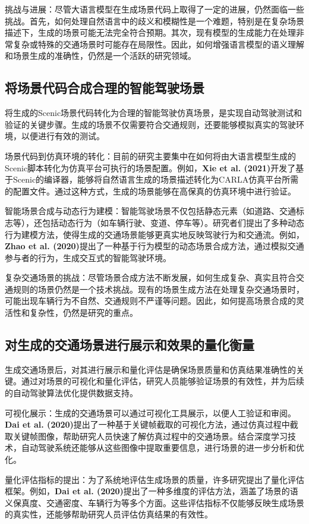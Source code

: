 	挑战与进展：尽管大语言模型在生成场景代码上取得了一定的进展，仍然面临一些挑战。首先，如何处理自然语言中的歧义和模糊性是一个难题，特别是在复杂场景描述下，生成的场景可能无法完全符合预期。其次，现有模型的生成能力在处理非常复杂或特殊的交通场景时可能存在局限性。因此，如何增强语言模型的语义理解和场景生成的准确性，仍然是一个活跃的研究领域。
	
	\subsection{将场景代码合成合理的智能驾驶场景}
	将生成的Scenic场景代码转化为合理的智能驾驶仿真场景，是实现自动驾驶测试和验证的关键步骤。生成的场景不仅需要符合交通规则，还要能够模拟真实的驾驶环境，以便进行有效的测试。
	
	场景代码到仿真环境的转化：目前的研究主要集中在如何将由大语言模型生成的Scenic脚本转化为仿真平台可执行的场景配置。例如，\textbf{Xie et al. (2021)}开发了基于Scenic的编译器，能够将自然语言生成的场景描述转化为CARLA仿真平台所需的配置文件。通过这种方式，生成的场景能够在高保真的仿真环境中进行验证。
	
	智能场景合成与动态行为建模：智能驾驶场景不仅包括静态元素（如道路、交通标志等），还包括动态行为（如车辆行驶、变道、停车等）。研究者们提出了多种动态行为建模方法，使得生成的交通场景能够更真实地反映驾驶行为和交通流。例如，\textbf{Zhao et al. (2020)}提出了一种基于行为模型的动态场景合成方法，通过模拟交通参与者的行为，生成交互式的智能驾驶环境。
	
	复杂交通场景的挑战：尽管场景合成方法不断发展，如何生成复杂、真实且符合交通规则的场景仍然是一个技术挑战。现有的场景生成方法在处理复杂交通场景时，可能出现车辆行为不自然、交通规则不严谨等问题。因此，如何提高场景合成的灵活性和复杂性，仍然是研究的重点。
	
	\subsection{对生成的交通场景进行展示和效果的量化衡量}
	生成交通场景后，对其进行展示和量化评估是确保场景质量和仿真结果准确性的关键。通过对场景的可视化和量化评估，研究人员能够验证场景的有效性，并为后续的自动驾驶算法优化提供数据支持。
	
	可视化展示：生成的交通场景可以通过可视化工具展示，以便人工验证和审阅。\textbf{Dai et al. (2020)}提出了一种基于关键帧截取的可视化方法，通过仿真过程中截取关键帧图像，帮助研究人员快速了解仿真过程中的交通场景。结合深度学习技术，自动驾驶系统还能够从这些图像中提取重要信息，进行场景的进一步分析和优化。
	
	量化评估指标的提出：为了系统地评估生成场景的质量，许多研究提出了量化评估框架。例如，\textbf{Dai et al. (2020)}提出了一种多维度的评估方法，涵盖了场景的语义保真度、交通密度、车辆行为等多个方面。这些评估指标不仅能够反映生成场景的真实性，还能够帮助研究人员评估仿真结果的有效性。
	
